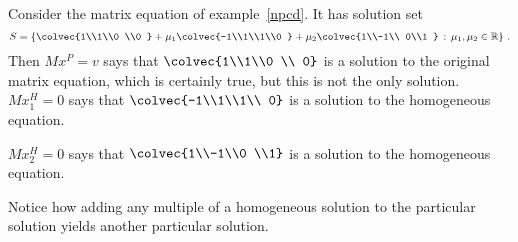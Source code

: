 \begin{example}
Consider the matrix equation of example~\ref{npcd}. It has  solution set
\[S = \left\{\colvec{1\\1\\0 \\0 } + \mu_1 \colvec{-1\\1\\1\\0 } + \mu_2 \colvec{1\\-1\\ 0\\1 } \, :\,  \mu_1,\mu_2 \in \mathbb{R} \right\} \, .\]
Then $Mx^P =v$ says that 
$\colvec{1\\1\\0 \\ 0}$ is a solution to the original matrix equation, which is certainly true, but this is not the only solution.\\

$Mx^H _1=0$ says that $\colvec{-1\\1\\1\\ 0}$ is a solution to the homogeneous equation.

\vspace{2mm}

$Mx^H _2=0$ says that 
$\colvec{1\\-1\\0 \\1}$ is a solution to the homogeneous equation.

\vspace{2mm}

\noindent
Notice how adding any multiple of a homogeneous solution to the particular solution yields another particular solution.
\end{example}





%


